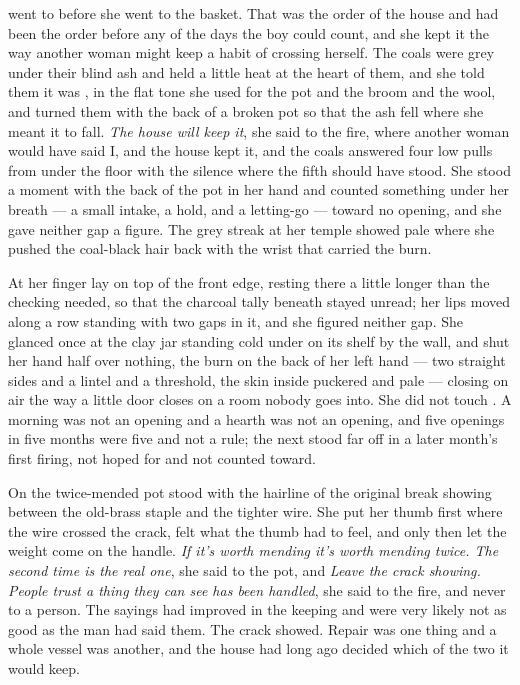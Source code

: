  went to  before she went to the basket. That was the order of the house and had been the order before any of the days the boy could count, and she kept it the way another woman might keep a habit of crossing herself. The coals were grey under their blind ash and held a little heat at the heart of them, and she told them it was , in the flat tone she used for the pot and the broom and the wool, and turned them with the back of a broken pot so that the ash fell where she meant it to fall. \emph{The house will keep it}, she said to the fire, where another woman would have said I, and the house kept it, and the coals answered four low pulls from under the floor with the silence where the fifth should have stood. She stood a moment with the back of the pot in her hand and counted something under her breath --- a small intake, a hold, and a letting-go --- toward no opening, and she gave neither gap a figure. The grey streak at her temple showed pale where she pushed the coal-black hair back with the wrist that carried the burn.

At  her finger lay on top of the front edge, resting there a little longer than the checking needed, so that the charcoal tally beneath stayed unread; her lips moved along a row standing with two gaps in it, and she figured neither gap. She glanced once at the clay jar standing cold under  on its shelf by the wall, and shut her hand half over nothing, the burn on the back of her left hand --- two straight sides and a lintel and a threshold, the skin inside puckered and pale --- closing on air the way a little door closes on a room nobody goes into. She did not touch . A morning was not an opening and a hearth was not an opening, and five openings in five months were five and not a rule; the next stood far off in a later month's first firing, not hoped for and not counted toward.

On  the twice-mended pot stood with the hairline of the original break showing between the old-brass staple and the tighter wire. She put her thumb first where the wire crossed the crack, felt what the thumb had to feel, and only then let the weight come on the handle. \emph{If it's worth mending it's worth mending twice. The second time is the real one}, she said to the pot, and \emph{Leave the crack showing. People trust a thing they can see has been handled}, she said to the fire, and never to a person. The sayings had improved in the keeping and were very likely not as good as the man had said them. The crack showed. Repair was one thing and a whole vessel was another, and the house had long ago decided which of the two it would keep.

